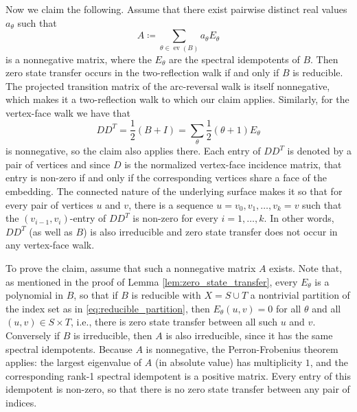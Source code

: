 \documentclass{article}
\numberwithin{equation}{section}
\DeclareMathOperator\ev{ev}
\begin{document}
Now we claim the following. Assume that there exist pairwise distinct real values $a_\theta$ such that
\[
A \coloneq \sum_{\theta \in \ev(B)} a_\theta E_\theta
\]
is a nonnegative matrix, where the $E_\theta$ are the spectral idempotents of $B$. Then zero state transfer  occurs in the two-reflection walk if and only if $B$ is reducible. The projected transition matrix of the arc-reversal walk is itself nonnegative, which makes it a two-reflection walk to which our claim applies. Similarly, for the vertex-face walk we have that
\[
DD^T = \frac{1}{2}(B + I) = \sum_{\theta} \frac{1}{2}(\theta + 1)E_\theta
\]
is nonnegative, so the claim also applies there. Each entry of $DD^T$ is denoted by a pair of vertices and since $D$ is the normalized vertex-face incidence matrix, that entry is non-zero if and only if the corresponding vertices share a face of the embedding. The connected nature of the underlying surface makes it so that for every pair of vertices $u$ and $v$, there is a sequence $u = v_0,v_1,\ldots,v_{k} = v$ such that the $(v_{i-1},v_{i})$-entry of $DD^T$ is non-zero for every $i=1,\ldots,k$. In other words, $DD^T$ (as well as $B$) is also irreducible and zero state transfer does not occur in any vertex-face walk.

To prove the claim, assume that such a nonnegative matrix $A$ exists. Note that, as mentioned in the proof of Lemma \ref{lem:zero_state_transfer}, every $E_\theta$ is a polynomial in $B$, so that if $B$ is reducible with $X = S\cup T$ a nontrivial partition of the index set as in \eqref{eq:reducible_partition}, then $E_\theta(u,v) = 0$ for all $\theta$ and all $(u,v) \in S \times T$, i.e., there is zero state transfer between all such $u$ and $v$.
Conversely if $B$ is irreducible, then $A$ is also irreducible, since it has the same spectral idempotents. Because $A$ is nonnegative, the Perron-Frobenius theorem applies: the largest eigenvalue of $A$ (in absolute value) has multiplicity $1$, and the corresponding rank-1 spectral idempotent is a positive matrix. Every entry of this idempotent is non-zero, so that there is no zero state transfer between any pair of indices.
\end{document}
